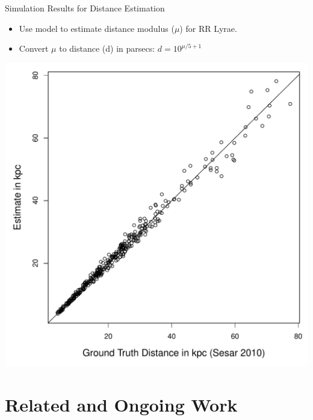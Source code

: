 \documentclass[12pt]{beamer}
\begin{document}
\begin{frame}{Simulation Results for Distance Estimation}
\begin{itemize}
\item Use model to estimate distance modulus ($\mu$) for RR Lyrae.
\item Convert $\mu$ to distance (d) in parsecs: $d = 10^{\mu/5 + 1}$
\end{itemize}

\begin{center}
\includegraphics[scale=.35]{figs/distance_comparison.pdf}
\end{center}



\end{frame}


\section{Related and Ongoing Work}

\end{document}
